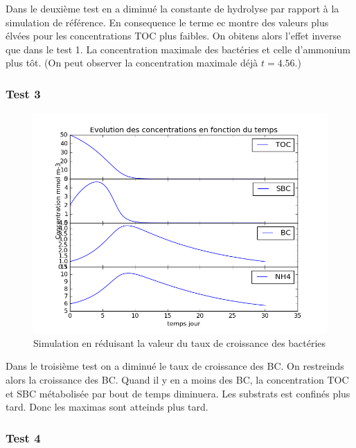 \par{
Dans le deuxième test en a diminué la constante de hydrolyse par rapport à la simulation de référence.
En consequence le terme ec montre des valeurs plus élvées pour les concentrations TOC plus faibles. On obitens
alors l'effet inverse que dans le test 1. La concentration maximale des bactéries et celle d'ammonium plus
tôt. (On peut observer la concentration maximale déjà $t=4.56$.)
}

\FloatBarrier
\newpage
\subsubsection{Test 3}

\begin{figure}[h!]
  \includegraphics[width=\textwidth]{partie1/Test3.png}
  \caption{Simulation en r\'eduisant la valeur du taux de croissance des bact\'eries
  }
  \label{fig:partie1test3}
\end{figure}

\par{
Dans le troisième test on a diminué le taux de croissance des BC. On restreinds alors la croissance des BC.
Quand il y en a moins des BC, la concentration TOC et SBC métabolisée par bout de temps diminuera. Les
substrats est confinés plus tard. Donc les maximas sont atteinds plus tard.
}

\FloatBarrier
\newpage
\subsubsection{Test 4}

